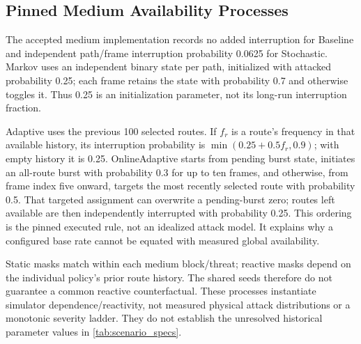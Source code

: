 \subsection{Pinned Medium Availability Processes}
\label{app:medium_threats}
The accepted medium implementation records no added interruption for Baseline and independent path/frame interruption probability 0.0625 for Stochastic. Markov uses an independent binary state per path, initialized with attacked probability 0.25; each frame retains the state with probability 0.7 and otherwise toggles it. Thus 0.25 is an initialization parameter, not its long-run interruption fraction.

Adaptive uses the previous 100 selected routes. If $f_r$ is a route's frequency in that available history, its interruption probability is $\min(0.25+0.5f_r,0.9)$; with empty history it is 0.25. OnlineAdaptive starts from pending burst state, initiates an all-route burst with probability 0.3 for up to ten frames, and otherwise, from frame index five onward, targets the most recently selected route with probability 0.5. That targeted assignment can overwrite a pending-burst zero; routes left available are then independently interrupted with probability 0.25. This ordering is the pinned executed rule, not an idealized attack model. It explains why a configured base rate cannot be equated with measured global availability.

Static masks match within each medium block/threat; reactive masks depend on the individual policy's prior route history. The shared seeds therefore do not guarantee a common reactive counterfactual. These processes instantiate simulator dependence/reactivity, not measured physical attack distributions or a monotonic severity ladder. They do not establish the unresolved historical parameter values in \cref{tab:scenario_specs}.
